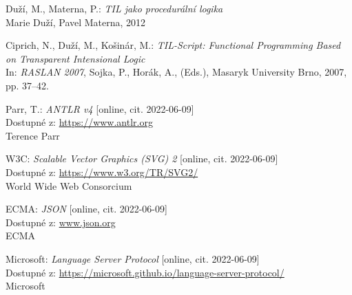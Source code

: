 \documentclass{article}
\begin{document}
\begin{thebibliography}{50}

Duží, M., Materna, P.: \textit{TIL jako procedurální logika} \\
Marie Duží, Pavel Materna, 2012

Ciprich, N., Duží, M., Košinár, M.: \textit{TIL-Script: Functional Programming Based on
Transparent Intensional Logic} \\
In: \textit{RASLAN 2007}, Sojka, P., Horák, A., (Eds.), Masaryk University Brno, 2007, pp. 37–42.

Parr, T.: \textit{ANTLR v4} [online, cit. 2022-06-09] \\
Dostupné z: \url{https://www.antlr.org} \\
Terence Parr

W3C: \textit{Scalable Vector Graphics (SVG) 2} [online, cit. 2022-06-09] \\
Dostupné z: \url{https://www.w3.org/TR/SVG2/} \\
World Wide Web Consorcium

ECMA: \textit{JSON} [online, cit. 2022-06-09] \\
Dostupné z: \url{www.json.org} \\
ECMA

Microsoft: \textit{Language Server Protocol} [online, cit. 2022-06-09] \\
Dostupné z: \url{https://microsoft.github.io/language-server-protocol/} \\
Microsoft

\end{thebibliography}
\end{document}
